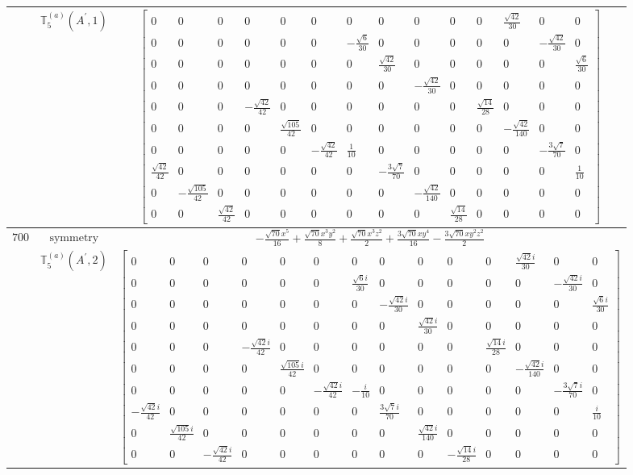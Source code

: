 \documentclass[fleqn,8pt,landscape]{jsarticle}
\begin{document}
\begin{longtable}{ccc}
$  $ & $ \mathbb{T}_{5}^{(a)}(A^{\prime},1) $ & $ \begin{bmatrix} 0 & 0 & 0 & 0 & 0 & 0 & 0 & 0 & 0 & 0 & 0 & \frac{\sqrt{42}}{30} & 0 & 0 \\ 0 & 0 & 0 & 0 & 0 & 0 & - \frac{\sqrt{6}}{30} & 0 & 0 & 0 & 0 & 0 & - \frac{\sqrt{42}}{30} & 0 \\ 0 & 0 & 0 & 0 & 0 & 0 & 0 & \frac{\sqrt{42}}{30} & 0 & 0 & 0 & 0 & 0 & \frac{\sqrt{6}}{30} \\ 0 & 0 & 0 & 0 & 0 & 0 & 0 & 0 & - \frac{\sqrt{42}}{30} & 0 & 0 & 0 & 0 & 0 \\ 0 & 0 & 0 & - \frac{\sqrt{42}}{42} & 0 & 0 & 0 & 0 & 0 & 0 & \frac{\sqrt{14}}{28} & 0 & 0 & 0 \\ 0 & 0 & 0 & 0 & \frac{\sqrt{105}}{42} & 0 & 0 & 0 & 0 & 0 & 0 & - \frac{\sqrt{42}}{140} & 0 & 0 \\ 0 & 0 & 0 & 0 & 0 & - \frac{\sqrt{42}}{42} & \frac{1}{10} & 0 & 0 & 0 & 0 & 0 & - \frac{3 \sqrt{7}}{70} & 0 \\ \frac{\sqrt{42}}{42} & 0 & 0 & 0 & 0 & 0 & 0 & - \frac{3 \sqrt{7}}{70} & 0 & 0 & 0 & 0 & 0 & \frac{1}{10} \\ 0 & - \frac{\sqrt{105}}{42} & 0 & 0 & 0 & 0 & 0 & 0 & - \frac{\sqrt{42}}{140} & 0 & 0 & 0 & 0 & 0 \\ 0 & 0 & \frac{\sqrt{42}}{42} & 0 & 0 & 0 & 0 & 0 & 0 & \frac{\sqrt{14}}{28} & 0 & 0 & 0 & 0 \end{bmatrix} $ \\ \hline
$ 700 $ & $ \text{symmetry} $ & $ - \frac{\sqrt{70} x^{5}}{16} + \frac{\sqrt{70} x^{3} y^{2}}{8} + \frac{\sqrt{70} x^{3} z^{2}}{2} + \frac{3 \sqrt{70} x y^{4}}{16} - \frac{3 \sqrt{70} x y^{2} z^{2}}{2} $ \\
$  $ & $ \mathbb{T}_{5}^{(a)}(A^{\prime},2) $ & $ \begin{bmatrix} 0 & 0 & 0 & 0 & 0 & 0 & 0 & 0 & 0 & 0 & 0 & \frac{\sqrt{42} i}{30} & 0 & 0 \\ 0 & 0 & 0 & 0 & 0 & 0 & \frac{\sqrt{6} i}{30} & 0 & 0 & 0 & 0 & 0 & - \frac{\sqrt{42} i}{30} & 0 \\ 0 & 0 & 0 & 0 & 0 & 0 & 0 & - \frac{\sqrt{42} i}{30} & 0 & 0 & 0 & 0 & 0 & \frac{\sqrt{6} i}{30} \\ 0 & 0 & 0 & 0 & 0 & 0 & 0 & 0 & \frac{\sqrt{42} i}{30} & 0 & 0 & 0 & 0 & 0 \\ 0 & 0 & 0 & - \frac{\sqrt{42} i}{42} & 0 & 0 & 0 & 0 & 0 & 0 & \frac{\sqrt{14} i}{28} & 0 & 0 & 0 \\ 0 & 0 & 0 & 0 & \frac{\sqrt{105} i}{42} & 0 & 0 & 0 & 0 & 0 & 0 & - \frac{\sqrt{42} i}{140} & 0 & 0 \\ 0 & 0 & 0 & 0 & 0 & - \frac{\sqrt{42} i}{42} & - \frac{i}{10} & 0 & 0 & 0 & 0 & 0 & - \frac{3 \sqrt{7} i}{70} & 0 \\ - \frac{\sqrt{42} i}{42} & 0 & 0 & 0 & 0 & 0 & 0 & \frac{3 \sqrt{7} i}{70} & 0 & 0 & 0 & 0 & 0 & \frac{i}{10} \\ 0 & \frac{\sqrt{105} i}{42} & 0 & 0 & 0 & 0 & 0 & 0 & \frac{\sqrt{42} i}{140} & 0 & 0 & 0 & 0 & 0 \\ 0 & 0 & - \frac{\sqrt{42} i}{42} & 0 & 0 & 0 & 0 & 0 & 0 & - \frac{\sqrt{14} i}{28} & 0 & 0 & 0 & 0 \end{bmatrix} $ \\ \hline

\end{longtable}
\end{document}
